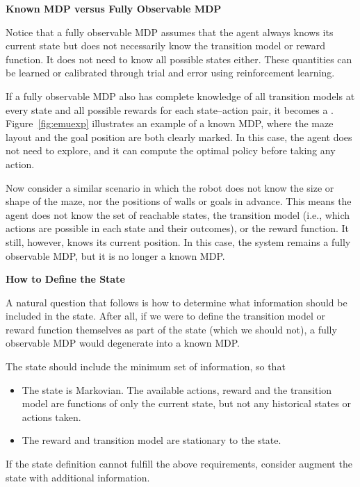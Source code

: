 \begin{mdframed}
	\noindent \textbf{Known MDP versus Fully Observable MDP}
	
	Notice that a fully observable MDP assumes that the agent always knows its current state but does not necessarily know the transition model or reward function. It does not need to know all possible states either. These quantities can be learned or calibrated through trial and error using reinforcement learning.
	
	If a fully observable MDP also has complete knowledge of all transition models at every state and all possible rewards for each state–action pair, it becomes a . Figure~\ref{fig:emuexp} illustrates an example of a known MDP, where the maze layout and the goal position are both clearly marked. In this case, the agent does not need to explore, and it can compute the optimal policy before taking any action.
	
	Now consider a similar scenario in which the robot does not know the size or shape of the maze, nor the positions of walls or goals in advance. This means the agent does not know the set of reachable states, the transition model (i.e., which actions are possible in each state and their outcomes), or the reward function. It still, however, knows its current position. In this case, the system remains a fully observable MDP, but it is no longer a known MDP.
	
	\vspace{0.1in}
	\noindent \textbf{How to Define the State}
	
	A natural question that follows is how to determine what information should be included in the state. After all, if we were to define the transition model or reward function themselves as part of the state (which we should not), a fully observable MDP would degenerate into a known MDP.
	
	The state should include the minimum set of information, so that
	\begin{itemize}
		\item The state is Markovian. The available actions, reward and the transition model are functions of only the current state, but not any historical states or actions taken.
		\item The reward and transition model are stationary to the state.
	\end{itemize}
	If the state definition cannot fulfill the above requirements, consider augment the state with additional information.
	

\end{mdframed}
